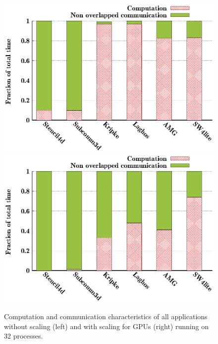 \begin{figure}[t]
  \centering
  \includegraphics[width=0.8\columnwidth]{figure/val/mpi-scaled.eps}
  \includegraphics[width=0.8\columnwidth]{figure/val/mpi.eps}
  \caption{Computation and communication characteristics of all applications without scaling (left) and with scaling for GPUs (right)
running on 32 processes.} 
  \label{fig:trace_profile}
\end{figure}



\label{sec:applicationworkload}

